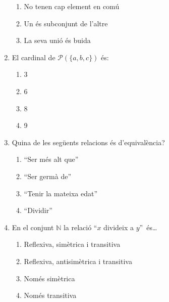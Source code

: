 \begin{enumerate}
\begin{enumerate}
\item No tenen cap element en com\'{u}

\item Un \'{e}s subconjunt de l'altre

\item La seva uni\'{o} \'{e}s buida
\end{enumerate}

\item El cardinal de $\mathcal{P}(\{a,b,c\})$ \'{e}s:

\begin{enumerate}
\item 3

\item 6

\item 8

\item 9
\end{enumerate}

\item Quina de les seg\"{u}ents relacions \'{e}s d'equival\`{e}ncia?

\begin{enumerate}
\item \textquotedblleft Ser m\'{e}s alt que\textquotedblright

\item \textquotedblleft Ser germ\`{a} de\textquotedblright

\item \textquotedblleft Tenir la mateixa edat\textquotedblright

\item \textquotedblleft Dividir\textquotedblright
\end{enumerate}

\item En el conjunt $\mathbb{N}$ la relaci\'{o} \textquotedblleft$x$ divideix
a $y$\textquotedblright\ \'{e}s\ldots

\begin{enumerate}
\item Reflexiva, sim\`{e}trica i transitiva

\item Reflexiva, antisim\`{e}trica i transitiva

\item Nom\'{e}s sim\`{e}trica

\item Nom\'{e}s transitiva
\end{enumerate}


\end{enumerate}
